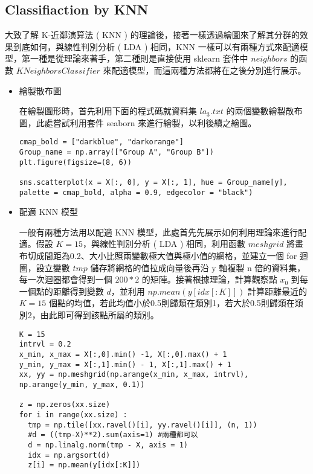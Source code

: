 \subsection{Classifiaction by KNN}

大致了解 K-近鄰演算法 ( KNN ) 的理論後，接著一樣透過繪圖來了解其分群的效果到底如何，與線性判別分析 ( LDA ) 相同，KNN 一樣可以有兩種方式來配適模型，第一種是從理論來著手，第二種則是直接使用 sklearn 套件中 $neighbors$ 的函數 $KNeighborsClassifier$ 來配適模型，而這兩種方法都將在之後分別進行展示。

\begin{itemize}

\item{} 繪製散布圖

在繪製圖形時，首先利用下面的程式碼就資料集 $la_3.txt$ 的兩個變數繪製散布圖，此處嘗試利用套件 seaborn 來進行繪製，以利後續之繪圖。

\bigskip
\begin{lstlisting}
cmap_bold = ["darkblue", "darkorange"]
Group_name = np.array(["Group A", "Group B"])
plt.figure(figsize=(8, 6))

sns.scatterplot(x = X[:, 0], y = X[:, 1], hue = Group_name[y], palette = cmap_bold, alpha = 0.9, edgecolor = "black")
\end{lstlisting}


\item{} 配適 KNN 模型

一般有兩種方法用以配適 KNN 模型，此處首先先展示如何利用理論來進行配適。假設 $K=15$，與線性判別分析 ( LDA ) 相同，利用函數 $meshgrid$ 將畫布切成間距為0.2、大小比照兩變數極大值與極小值的網格，並建立一個 for 迴圈，設立變數 $tmp$ 儲存將網格的值拉成向量後再沿 y 軸複製 n 倍的資料集，每一次迴圈都會得到一個 $200*2$ 的矩陣。接著根據理論，計算觀察點 $x_0$ 到每一個點的距離得到變數 $d$，並利用 $np.mean(y[idx[:K]])$ 計算距離最近的 $K=15$ 個點的均值，若此均值小於0.5則歸類在類別1，若大於0.5則歸類在類別2，由此即可得到該點所屬的類別。

\bigskip
\begin{lstlisting}
K = 15
intrvl = 0.2 
x_min, x_max = X[:,0].min() -1, X[:,0].max() + 1
y_min, y_max = X[:,1].min() - 1, X[:,1].max() + 1
xx, yy = np.meshgrid(np.arange(x_min, x_max, intrvl), np.arange(y_min, y_max, 0.1)) 

z = np.zeros(xx.size) 
for i in range(xx.size) :
  tmp = np.tile([xx.ravel()[i], yy.ravel()[i]], (n, 1)) 
  #d = ((tmp-X)**2).sum(axis=1) #兩種都可以
  d = np.linalg.norm(tmp - X, axis = 1) 
  idx = np.argsort(d) 
  z[i] = np.mean(y[idx[:K]]) 


\end{lstlisting}
\end{itemize}
